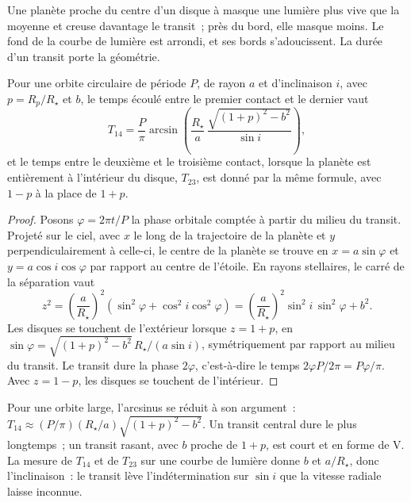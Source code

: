 Une planète proche du centre d'un disque à  masque une lumière plus vive
que la moyenne et creuse davantage le transit~; près du bord, elle masque moins. Le
fond de la courbe de lumière est arrondi, et ses bords s'adoucissent. La durée
d'un transit porte la géométrie.

\begin{theorem}\label{thm:b3:exoplanets:duration}
Pour une orbite circulaire de période $P$, de rayon $a$ et d'inclinaison $i$, avec
$p = R_p/R_\star$ et  $b$, le temps écoulé entre le premier
contact et le dernier vaut
\[
T_{14} = \frac{P}{\pi}\arcsin\!\left(\frac{R_\star}{a}\,
          \frac{\sqrt{(1 + p)^2 - b^2}}{\sin i}\right),
\]
et le temps entre le deuxième et le troisième contact, lorsque la planète est
entièrement à l'intérieur du disque, $T_{23}$, est donné par la même formule, avec
$1 - p$ à la place de $1 + p$.
\end{theorem}

\begin{proof}
Posons $\varphi = 2\pi t/P$ la phase orbitale comptée à partir du milieu du transit.
Projeté sur le ciel, avec $x$ le long de la trajectoire de la planète et $y$ perpendiculairement à celle-ci,
le centre de la planète se trouve en $x = a\sin\varphi$ et $y = a\cos i\cos\varphi$
par rapport au centre de l'étoile. En rayons stellaires, le carré de la séparation vaut
\[
z^2 = \left(\frac{a}{R_\star}\right)^2(\sin^2\varphi + \cos^2 i\cos^2\varphi)
    = \left(\frac{a}{R_\star}\right)^2\sin^2 i\,\sin^2\varphi + b^2 .
\]
Les disques se touchent de l'extérieur lorsque $z = 1 + p$, en
$\sin\varphi = \sqrt{(1 + p)^2 - b^2}\,R_\star/(a\sin i)$, symétriquement
par rapport au milieu du transit. Le transit dure la phase $2\varphi$, c'est-à-dire
le temps $2\varphi P/2\pi = P\varphi/\pi$. Avec $z = 1 - p$, les disques se touchent
de l'intérieur.
\end{proof}

Pour une orbite large, l'arcsinus se réduit à son argument~: $T_{14} \approx (P/\pi)
(R_\star/a)\sqrt{(1 + p)^2 - b^2}$. Un transit central dure le plus longtemps~; un transit
rasant, avec $b$ proche de $1 + p$, est court et en forme de V. La mesure de $T_{14}$
et de $T_{23}$ sur une courbe de lumière donne $b$ et $a/R_\star$, donc l'inclinaison~: le
transit lève l'indétermination sur $\sin i$ que la vitesse radiale laisse
inconnue.

